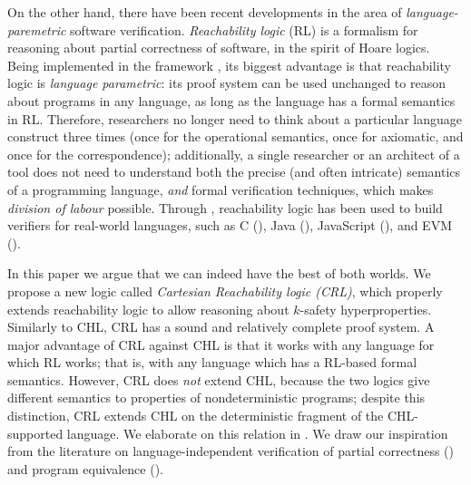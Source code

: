 On the other hand, there have been recent developments in the area of
\emph{language-paremetric} software verification.  \emph{Reachability logic}
(RL) \cite{RosuS12oopsla,RosuSCM13lics,StefanescuCMMSR19} is a formalism for
reasoning about partial correctness of software, in the spirit of Hoare
logics.  Being implemented in the \K{} framework \cite{KVision}, its biggest
advantage is that reachability logic is \emph{language parametric}: its proof
system can be used unchanged to reason about programs in any language, as long
as the language has a formal semantics in RL.  Therefore, researchers no
longer need to think about a particular language construct three times (once
for the operational semantics, once for axiomatic, and once for the
correspondence); additionally, a single researcher or an architect of a tool does not
need to understand both the precise (and often intricate) semantics of a
programming language, \emph{and} formal verification techniques, which makes
\emph{division of labour} possible.  Through \K{}, reachability logic has been
used to build verifiers for real-world languages, such as C (\cite{RVMatch}),
Java (\cite{StefanescuPYLR16VerifiersForAll}), JavaScript
(\cite{StefanescuPYLR16VerifiersForAll}), and EVM
(\cite{KevmVerificationTool}).

In this paper we argue that we can indeed have the best of both worlds.  We
propose a new logic called \emph{Cartesian Reachability logic (CRL)}, which
properly extends reachability logic to allow reasoning about $k$-safety
hyperproperties. Similarly to CHL, CRL has a sound and relatively complete
proof system. A major advantage of CRL against CHL is that it works with any
language for which RL works; that is, with any language which has a RL-based
formal semantics.  However, CRL does \emph{not} extend CHL, because the two
logics give different semantics to properties of nondeterministic programs;
despite this distinction, CRL extends CHL on the deterministic fragment of the
CHL-supported language.  We elaborate on this relation in
.  We draw our inspiration from the literature on
language-independent verification of partial correctness
(\cite{RosuS12oopsla,RosuSCM13lics,StefanescuCMMSR19}) and program equivalence
(\cite{CiobacaLRR16,CiobacaLRR14}).  


